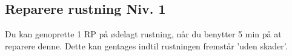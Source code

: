 \subsection*{Reparere rustning Niv. 1}
Du kan genoprette 1 RP på ødelagt rustning, når du benytter 5 min på at reparere denne. Dette kan gentages indtil rustningen fremstår 'uden skader'.\\